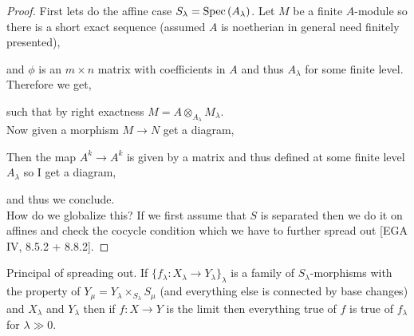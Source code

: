 \documentclass[12pt]{article}
\begin{document}
\begin{proof}
First lets do the affine case $S_\lambda = \mathrm{Spec}\left( A_\lambda \right)$. Let $M$ be a finite $A$-module so there is a short exact sequence (assumed $A$ is noetherian in general need finitely presented),
\begin{center}
\end{center}
and $\phi$ is an $m \times n$ matrix with coefficients in $A$ and thus $A_{\lambda}$ for some finite level. Therefore we get,
\begin{center}
\end{center}
such that by right exactness $M = A \otimes_{A_\lambda} M_\lambda$.
\bigskip\\
Now given a morphism $M \to N$ get a diagram,
\begin{center}
\end{center}
Then the map $A^k \to A^k$ is given by a matrix and thus defined at some finite level $A_\lambda$ so I get a diagram,
\begin{center}
\end{center}
and thus we conclude.
\bigskip\\
How do we globalize this? If we first assume that $S$ is separated then we do it on affines and check the cocycle condition which we have to further spread out [EGA IV, 8.5.2 + 8.8.2].
\end{proof}

\begin{rmk}
Principal of spreading out. If $\{ f_\lambda : X_\lambda \to Y_\lambda \}_\lambda$ is a family of $S_\lambda$-morphisms with the property of $Y_\mu = Y_\lambda \times_{S_\lambda} S_\mu$ (and everything else is connected by base changes) and $X_\lambda$ and $Y_\lambda$  then if $f : X \to Y$ is the limit then everything true of $f$ is true of $f_\lambda$ for $\lambda \gg 0$. 
\end{rmk}
\end{document}
